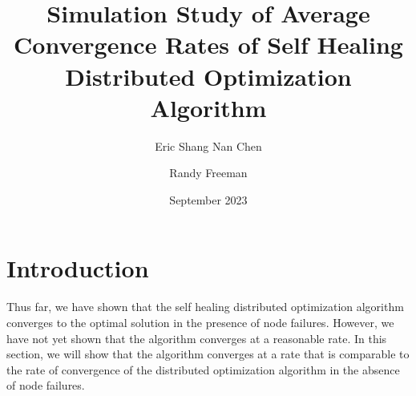 \documentclass{article}
\begin{document}
\title{Simulation Study of Average Convergence Rates of Self Healing Distributed Optimization Algorithm}
\author{Eric Shang Nan Chen}
\author{Randy Freeman}
\date{September 2023}

\maketitle

\section{Introduction}
\label{sec:introduction}

Thus far, we have shown that the self healing distributed optimization algorithm 
converges to the optimal solution in the presence of node failures. However, we have not yet shown 
that the algorithm converges at a reasonable rate. In this section, we will show that the algorithm 
converges at a rate that is comparable to the rate of convergence of the distributed optimization algorithm 
in the absence of node failures. \autocite{ridgleySelfHealingFirstOrderDistributed2021}

\printbibliography
\end{document}
